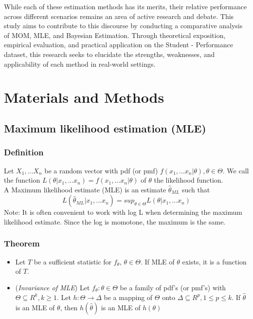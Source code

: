 \documentclass[12pt]{article}
\begin{document}
	While each of these estimation methods has its merits, their relative performance across different scenarios remains an area of active research and debate. This study aims to contribute to this discourse by conducting a comparative analysis of MOM, MLE, and Bayesian Estimation. Through theoretical exposition, empirical evaluation, and practical application on the Student - Performance dataset, this research seeks to elucidate the strengths, weaknesses, and applicability of each method in real-world settings.
	
	\section{ Materials and Methods}
	\subsection{Maximum likelihood estimation (MLE)}
	\subsubsection{Definition}
	Let ${X_{1},...X_{n}}$ be a random vector with pdf (or pmf) $f(x_{1},...x_{n}|\theta), \theta \in \Theta$. We call the function $L(\theta|x_{1},...x_{n}) = f(x_{1},...x_{n}|\theta)$ of $\theta$ the likelihood function. 
	\\
	A Maximum likelihood estimate (MLE) is an estimate $\hat{\theta}_{ML}$ such that
	$$L(\hat{\theta}_{ML}|x_{1},...x_{n}) = sup_{\theta \in \Theta} L(\theta|x_{1},...x_{n})$$
	Note: It is often convenient to work with log L when determining the maximum likelihood estimate. Since the log is momotone, the maximum is the same. 
	
	\subsubsection{Theorem}
	\begin{itemize}
	\item Let $T$ be a sufficient statistic for $f_{\theta}$, $\theta \in \Theta$. If MLE of $\theta$ exists, it is a function of $T$. 
	
	\item (\textit{Invariance of MLE}) Let ${f_{\theta}: \theta \in \Theta}$ be a family of pdf’s (or pmf’s) with $\Theta \subseteq R^{k}, k\geq 1$. Let $h: \Theta \longrightarrow \Delta$ be a mapping of $\Theta$ onto $\Delta \subseteq R^{p}, 1\leq p \leq k$. If $\hat{\theta}$ is an MLE of $\theta$, then $h(\hat{\theta})$ is an MLE of $h(\theta)$
	\end{itemize}
	
\end{document}
